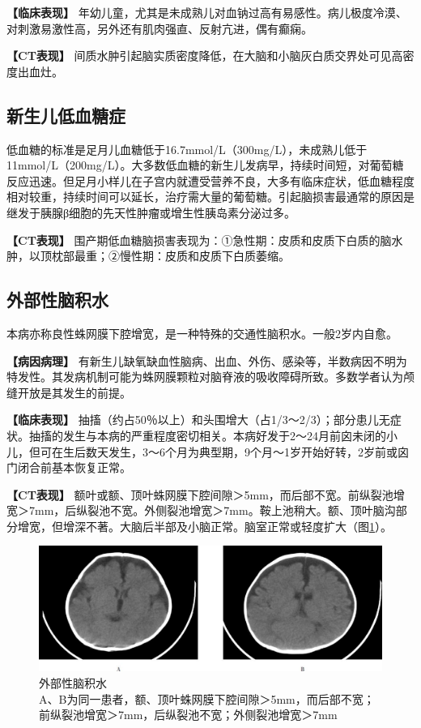 \textbf{【临床表现】}
年幼儿童，尤其是未成熟儿对血钠过高有易感性。病儿极度冷漠、对刺激易激性高，另外还有肌肉强直、反射亢进，偶有癫痫。

\textbf{【CT表现】}
间质水肿引起脑实质密度降低，在大脑和小脑灰白质交界处可见高密度出血灶。

\subsection{新生儿低血糖症}

低血糖的标准是足月儿血糖低于16.7mmol/L（300mg/L），未成熟儿低于11mmol/L（200mg/L）。大多数低血糖的新生儿发病早，持续时间短，对葡萄糖反应迅速。但足月小样儿在子宫内就遭受营养不良，大多有临床症状，低血糖程度相对较重，持续时间可以延长，治疗需大量的葡萄糖。引起脑损害最通常的原因是继发于胰腺β细胞的先天性肿瘤或增生性胰岛素分泌过多。

\textbf{【CT表现】}
围产期低血糖脑损害表现为：①急性期：皮质和皮质下白质的脑水肿，以顶枕部最重；②慢性期：皮质和皮质下白质萎缩。

\subsection{外部性脑积水}

本病亦称良性蛛网膜下腔增宽，是一种特殊的交通性脑积水。一般2岁内自愈。

\textbf{【病因病理】}
有新生儿缺氧缺血性脑病、出血、外伤、感染等，半数病因不明为特发性。其发病机制可能为蛛网膜颗粒对脑脊液的吸收障碍所致。多数学者认为颅缝开放是其发生的前提。

\textbf{【临床表现】}
抽搐（约占50％以上）和头围增大（占1/3～2/3）；部分患儿无症状。抽搐的发生与本病的严重程度密切相关。本病好发于2～24月前囟未闭的小儿，但可在生后数天发生，3～6个月为典型期，9个月～1岁开始好转，2岁前或囟门闭合前基本恢复正常。

\textbf{【CT表现】}
额叶或额、顶叶蛛网膜下腔间隙＞5mm，而后部不宽。前纵裂池增宽＞7mm，后纵裂池不宽。外侧裂池增宽＞7mm。鞍上池稍大。额、顶叶脑沟部分增宽，但增深不著。大脑后半部及小脑正常。脑室正常或轻度扩大（图\ref{fig2-16}）。

\begin{figure}[!htbp]
 {\centering
 \includegraphics[width=.7\textwidth,height=\textheight,keepaspectratio]{./images/Image00032.jpg}
 \captionsetup{justification=centering}
 \caption{外部性脑积水\\{\small  A、B为同一患者，额、顶叶蛛网膜下腔间隙＞5mm，而后部不宽；前纵裂池增宽＞7mm，后纵裂池不宽；外侧裂池增宽＞7mm}}
 \label{fig2-16}}
  \end{figure} 



